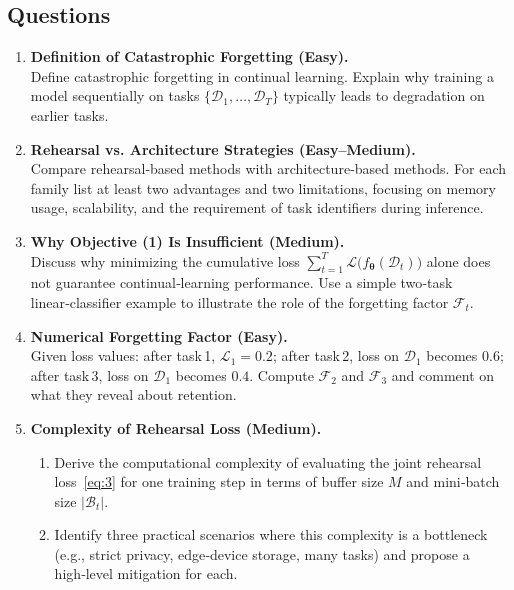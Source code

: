 \documentclass[12pt, a4paper]{article}
\begin{document}
\subsection*{Questions}
\begin{enumerate}
  \item \textbf{Definition of Catastrophic Forgetting (Easy).}\\
  Define catastrophic forgetting in continual learning. Explain why training a model sequentially on tasks $\{\mathcal D_{1},\dots ,\mathcal D_{T}\}$ typically leads to degradation on earlier tasks.

  \item \textbf{Rehearsal vs. Architecture Strategies (Easy–Medium).}\\
  Compare rehearsal‑based methods with architecture‑based methods. For each family list at least two advantages and two limitations, focusing on memory usage, scalability, and the requirement of task identifiers during inference.

  \item \textbf{Why Objective (1) Is Insufficient (Medium).}\\
  Discuss why minimizing the cumulative loss $\sum_{t=1}^{T}\mathcal L\bigl(f_{\boldsymbol\theta}(\mathcal D_{t})\bigr)$ alone does not guarantee continual‑learning performance. Use a simple two‑task linear‑classifier example to illustrate the role of the forgetting factor $\mathcal F_{t}$.

  \item \textbf{Numerical Forgetting Factor (Easy).}\\
  Given loss values: after task 1, $\mathcal L_{1}=0.2$; after task 2, loss on $\mathcal D_{1}$ becomes $0.6$; after task 3, loss on $\mathcal D_{1}$ becomes $0.4$. Compute $\mathcal F_{2}$ and $\mathcal F_{3}$ and comment on what they reveal about retention.

  \item \textbf{Complexity of Rehearsal Loss (Medium).}\\
  \begin{enumerate}
    \item Derive the computational complexity of evaluating the joint rehearsal loss~\eqref{eq:3} for one training step in terms of buffer size $M$ and mini‑batch size $|\mathcal B_{t}|$.
    \item Identify three practical scenarios where this complexity is a bottleneck (e.g., strict privacy, edge‑device storage, many tasks) and propose a high‑level mitigation for each.
  \end{enumerate}


\end{enumerate}
\end{document}
